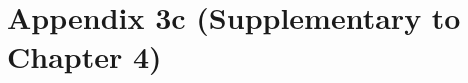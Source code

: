 \documentclass[openright,12pt,a4paper]{memoir}
\begin{document}
\clearpage


\clearpage


\clearpage


\clearpage


\clearpage


\clearpage

\backmatter


\clearpage


\clearpage


\clearpage


\clearpage


\clearpage


\clearpage

\chapter[Appendix 3c]{Appendix 3c (Supplementary to Chapter 4)}

\clearpage


\clearpage


\clearpage

\end{document}
